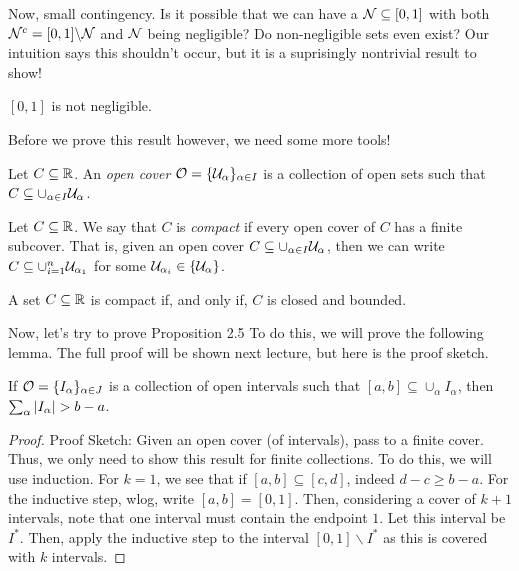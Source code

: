 Now, small contingency. Is it possible that we can have a $\cal{N} \subseteq [0, 1]$ with both $\cal{N}^{c} = [0, 1] \backslash \cal{N}$ and $\cal{N}$ being negligible? Do non-negligible sets even exist? Our intuition says this shouldn't occur, but it is a suprisingly nontrivial result to show! 

\begin{lemma}
    $[0, 1]$ is not negligible. 
\end{lemma}
Before we prove this result however, we need some more tools!

\begin{definition}
    Let $C \subseteq \R$. An \emph{open cover} $\cal{O} = \{\cal{U}_{\alpha}\}_{\alpha \in I}$ is a collection of open sets such that $C \subseteq \cup_{\alpha \in I} \cal{U}_{\alpha}$. 
\end{definition}

\begin{definition}
    Let $C \subseteq \R$. We say that $C$ is \emph{compact} if every open cover of $C$ has a finite subcover. That is, given an open cover $C \subseteq \cup_{\alpha \in I} \cal{U}_{\alpha}$, then we can write $C \subseteq \cup_{i = 1}^{n} \cal{U}_{\alpha_1}$ for some $\cal{U}_{\alpha_i} \in \{\cal{U}_{\alpha}\}$. 
\end{definition}

\begin{theorem}
    A set $C \subseteq \R$ is compact if, and only if, $C$ is closed and bounded.
\end{theorem}

Now, let's try to prove Proposition 2.5 To do this, we will prove the following lemma. The full proof will be shown next lecture, but here is the proof sketch. 

\begin{lemma}
    If $\cal{O} = \{I_\alpha\}_{\alpha \in J}$ is a collection of open intervals such that $[a, b] \subseteq \cup_{\alpha} I_{\alpha}$, then $\sum_{\alpha} \abs{I_{\alpha}} > b - a$. 
\end{lemma}
\begin{proof}{Proof Sketch:}
    Given an open cover (of intervals), pass to a finite cover. Thus, we only need to show this result for finite collections. To do this, we will use induction. For $k = 1$, we see that if $[a, b] \subseteq [c, d]$, indeed $d - c \geq b - a$. For the inductive step, wlog, write $[a, b] = [0, 1]$. Then, considering a cover of $k + 1$ intervals, note that one interval must contain the endpoint $1$. Let this interval be $I^{*}$. Then, apply the inductive step to the interval $[0, 1] \backslash I^{*}$ as this is covered with $k$ intervals. 
\end{proof}
\clearpage